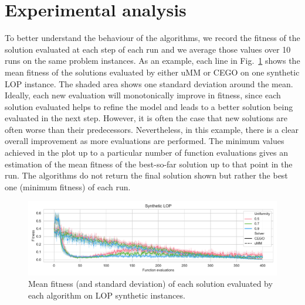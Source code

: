 \documentclass[runningheads]{llncs}
\begin{document}
\section{Experimental analysis}


To better understand the behaviour of the algorithms, we record the fitness of
the solution evaluated at each step of each run and we average those values
over 10 runs on the same problem instances.  As an example, each line in Fig.~\ref{fig:lop_synth} 
shows the mean fitness of the solutions evaluated by either uMM or CEGO on one synthetic LOP
instance. The shaded area shows one standard deviation around the
mean. Ideally, each new evaluation will monotonically improve in fitness, since each solution evaluated helps to refine the model and leads to a
better solution being evaluated in the next step.  However, it is often the case that  
new solutions
are often worse than their predecessors. Nevertheless, in this example, there
is a clear overall improvement as more evaluations are performed. The minimum
values achieved in the plot up to a particular number of function evaluations
gives an estimation of the mean fitness of the best-so-far solution up to that
point in the run. The algorithms do not return the final solution shown but
rather the best one (minimum fitness) of each run.


\begin{figure}[tb]
  \centering%
  \includegraphics[width=\textwidth]{img/synthetic_LOP_combined}
  \caption{Mean fitness  (and standard deviation)  of each solution evaluated by each algorithm on LOP synthetic instances.\label{fig:lop_synth}}
\end{figure}
\end{document}
